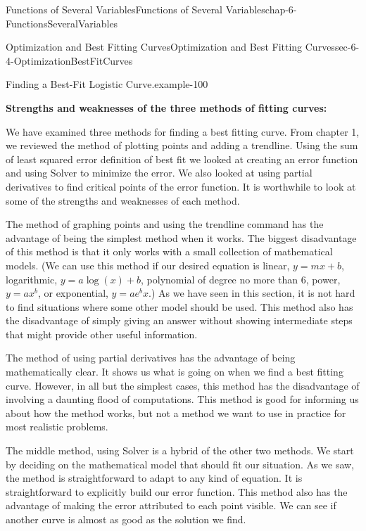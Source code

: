 \documentclass[oneside,10pt,]{book}
\newcommand{\terminology}[1]{\textbf{#1}}
\numberwithin{equation}{section}
\begin{document}
\begin{chapterptx}{Functions of Several Variables}{}{Functions of Several Variables}{}{}{chap-6-FunctionsSeveralVariables}
\begin{sectionptx}{Optimization and Best Fitting Curves}{}{Optimization and Best Fitting Curves}{}{}{sec-6-4-OptimizationBestFitCurves}
\begin{example}{Finding a Best-Fit Logistic Curve.}{example-100}
\begin{sidebyside}{1}{0.1}{0.1}{0}
\begin{sbspanel}{0.8}
\end{sbspanel}%
\end{sidebyside}%
\end{example}
\hypertarget{p-2470}{}%
\terminology{Strengths and weaknesses of the three methods of fitting curves:}%
\par
\hypertarget{p-2471}{}%
We have examined three methods for finding a best fitting curve.  From chapter 1, we reviewed the method of plotting points and adding a trendline.  Using the sum of least squared error definition of best fit we looked at creating an error function and using Solver to minimize the error.  We also looked at using partial derivatives to find critical points of the error function.  It is worthwhile to look at some of the strengths and weaknesses of each method.%
\par
\hypertarget{p-2472}{}%
The method of graphing points and using the trendline command has the advantage of being the simplest method when it works.  The biggest disadvantage of this method is that it only works with a small collection of mathematical models.  (We can use this method if our desired equation is linear, \(y=mx+b\), logarithmic, \(y=a \log(x)+b\), polynomial of degree no more than 6, power, \(y=ax^b\), or exponential, \(y=ae^bx\).)  As we have seen in this section, it is not hard to find situations where some other model should be used.  This method also has the disadvantage of simply giving an answer without showing intermediate steps that might provide other useful information.%
\par
\hypertarget{p-2473}{}%
The method of using partial derivatives has the advantage of being mathematically clear.  It shows us what is going on when we find a best fitting curve.  However, in all but the simplest cases, this method has the disadvantage of involving a daunting flood of computations.  This method is good for informing us about how the method works, but not a method we want to use in practice for most realistic problems.%
\par
\hypertarget{p-2474}{}%
The middle method, using Solver is a hybrid of the other two methods.  We start by deciding on the mathematical model that should fit our situation.  As we saw, the method is straightforward to adapt to any kind of equation.  It is straightforward to explicitly build our error function.  This method also has the advantage of making the error attributed to each point visible.  We can see if another curve is almost as good as the solution we find.%
\par

\end{sectionptx}
\end{chapterptx}
\end{document}
